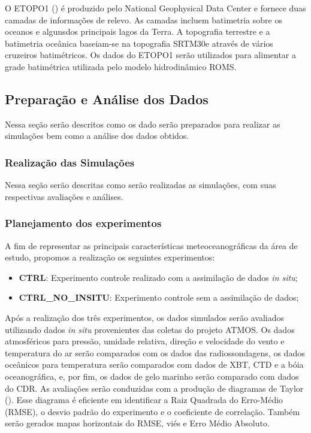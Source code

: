 \documentclass{article}
\begin{document}
O ETOPO1 (\cite{Amante2009}) é produzido pelo National Geophysical Data Center e fornece duas camadas de informações 
de relevo. As camadas incluem batimetria sobre os oceanos e algunsdos principais lagos da Terra. A topografia terrestre 
e a batimetria oceânica baseiam-se na topografia SRTM30e através de vários cruzeiros batimétricos. Os dados do ETOPO1 serão utilizados 
para alimentar a grade batimétrica utilizada pelo modelo hidrodinâmico ROMS.

\subsection{Preparação e Análise dos Dados}
\bigskip

Nessa seção serão descritos como os dado serão preparados para realizar as simulações bem como a análise dos dados obtidos.

\subsubsection{Realização das Simulações}
\bigskip

Nessa seção serão descritas como serão realizadas as simulações, com suas respectivas avaliações e análises.

\subsubsection{Planejamento dos experimentos}
\bigskip

A fim de representar as principais características meteoceanográficas da área de estudo, propomos a realização os seguintes experimentos:
\bigskip

\begin{itemize}
	\item \textbf{CTRL}: Experimento controle realizado com a assimilação de dados \textit{in situ};
	\item \textbf{CTRL\_NO\_INSITU}: Experimento controle sem a assimilação de dados;
\end{itemize}
\bigskip

Após a realização dos três experimentos, os dados simulados serão avaliados utilizando  dados \textit{in  situ} provenientes das coletas do projeto ATMOS.
Os dados atmosféricos para pressão, umidade relativa, direção e velocidade do vento e temperatura do ar serão comparados com os dados das radiossondagens, os dados oceânicos 
para temperatura serão comparados com dados  de XBT, CTD e a bóia oceanográfica, e, por fim, os dados de gelo marinho serão comparado com dados do CDR. 
As avaliações serão conduzidas com  a produção de diagramas de Taylor (\cite{Taylor2001}). Esse diagrama é eficiente em identificar a Raiz 
Quadrada do Erro-Médio (RMSE), o desvio padrão do experimento e o coeficiente de correlação. Também serão gerados mapas horizontais 
do RMSE, viés e Erro Médio Absoluto.
\bigskip
\end{document}
